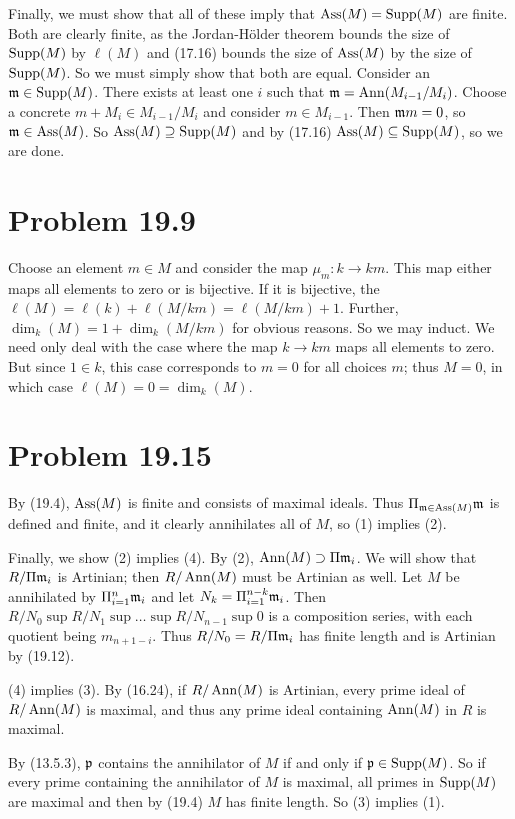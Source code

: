 \documentclass{pset}
\begin{document}
Finally, we must show that all of these imply that $\operatorname{Ass}(M) =
\operatorname{Supp}(M)$ are finite.  Both are clearly finite, as the Jordan-H\"older
theorem bounds the size of $\operatorname{Supp}(M)$ by $\ell(M)$ and (17.16) bounds
the size of $\operatorname{Ass}(M)$ by the size of $\operatorname{Supp}(M)$.  So we must simply
show that both are equal.  Consider an $\mathfrak{m} \in \operatorname{Supp}(M)$.  There exists
at least one $i$ such that $\mathfrak{m} = \operatorname{Ann}(M_{i-1} / M_i)$.  Choose a
concrete $m + M_i \in M_{i-1} / M_i$ and consider $m \in M_{i-1}$.  Then $\mathfrak{m} m =
0$, so $\mathfrak{m} \in \operatorname{Ass}(M)$.  So $\operatorname{Ass}(M) \supseteq \operatorname{Supp}(M)$ and by (17.16) $\operatorname{Ass}(M)
\subseteq \operatorname{Supp}(M)$, so we are done.
\section{Problem 19.9}
\label{sec-3}


Choose an element $m \in M$ and consider the map $\mu_m : k \to k m$.  This
map either maps all elements to zero or is bijective.  If it is
bijective, the $\ell(M) = \ell(k) + \ell(M / k m) = \ell(M / k m) +
1$.  Further, $\dim_k(M) = 1 + \dim_k(M / k m)$ for obvious reasons.  So
we may induct.  We need only deal with the case where the map $k \to k
m$ maps all elements to zero.  But since $1 \in k$, this case
corresponds to $m = 0$ for all choices $m$; thus $M = 0$, in which
case $\ell(M) = 0 = \dim_k(M)$.
  
\section{Problem 19.15}
\label{sec-4}


By (19.4), $\operatorname{Ass}(M)$ is finite and consists of maximal ideals.  Thus
$\Pi_{\mathfrak{m} \in \operatorname{Ass}(M)} \mathfrak{m}$ is defined and finite, and it clearly annihilates
all of $M$, so (1) implies (2).

Finally, we show (2) implies (4).  By (2), $\operatorname{Ann}(M) \supset \Pi \mathfrak{m}_i$.  We will
show that $R / \Pi \mathfrak{m}_i$ is Artinian; then $R / \operatorname{Ann}(M)$ must be Artinian
as well.  Let $M$ be annihilated by $\Pi_{i=1}^n \mathfrak{m}_i$ and let $N_k =
\Pi_{i=1}^{n-k} \mathfrak{m}_i$.  Then $R / N_0 \sup R / N_1 \sup \dots \sup R / N_{n-1} \sup 0$ is a
composition series, with each quotient being $m_{n+1-i}$.  Thus $R / N_0 =
R / \Pi \mathfrak{m}_i$ has finite length and is Artinian by (19.12).

(4) implies (3).  By (16.24), if $R / \operatorname{Ann}(M)$ is Artinian, every
prime ideal of $R / \operatorname{Ann}(M)$ is maximal, and thus any prime ideal
containing $\operatorname{Ann}(M)$ in $R$ is maximal.

By (13.5.3), $\mathfrak{p}$ contains the annihilator of $M$ if and only if $\mathfrak{p} \in
\operatorname{Supp}(M)$.  So if every prime containing the annihilator of $M$ is
maximal, all primes in $\operatorname{Supp}(M)$ are maximal and then by (19.4) $M$
has finite length.  So (3) implies (1).
\end{document}

